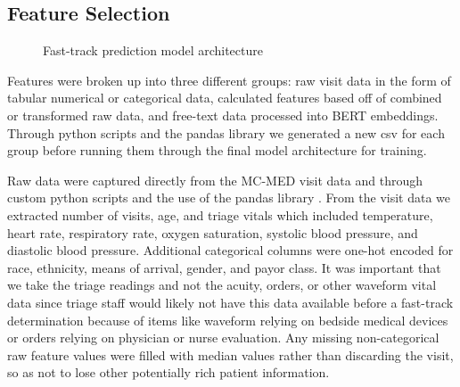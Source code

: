 \documentclass[sigconf]{acmart}
\begin{document}
\subsection{Feature Selection}
\begin{figure}[t]  %
    \centering
    
    \caption{Fast-track prediction model architecture}
    \label{fig:model-architecture}
\end{figure}

Features were broken up into three different groups: raw visit data in the form of tabular numerical or categorical data, calculated features based off of combined or transformed raw data, and free-text data processed into BERT embeddings. Through python scripts and the pandas library we generated a new csv for each group before running them through the final model architecture for training.

Raw data were captured directly from the MC-MED visit data and through custom python scripts and the use of the pandas library \cite{mckinney-proc-scipy-2010}. From the visit data we extracted number of visits, age, and triage vitals which included temperature, heart rate, respiratory rate, oxygen saturation, systolic blood pressure, and diastolic blood pressure. Additional categorical columns were one-hot encoded for race, ethnicity, means of arrival, gender, and payor class. It was important that we take the triage readings and not the acuity, orders, or other waveform vital data since triage staff would likely not have this data available before a fast-track determination because of items like waveform relying on bedside medical devices or orders relying on physician or nurse evaluation. Any missing non-categorical raw feature values were filled with median values rather than discarding the visit, so as not to lose other potentially rich patient information.
\end{document}
